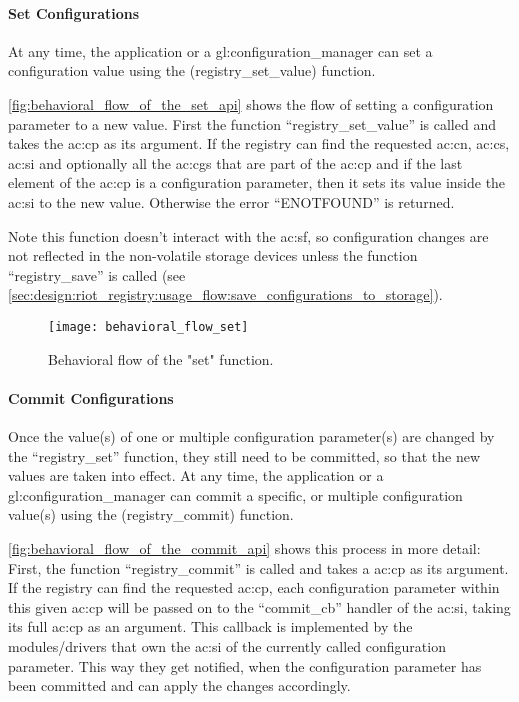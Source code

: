 \paragraph{Set Configurations}\mbox{}

At any time, the application or a \gls{gl:configuration_manager} can set a configuration value using the (registry\_set\_value) function.

\autoref{fig:behavioral_flow_of_the_set_api} shows the flow of setting a configuration parameter to a new value.
First the function ``registry\_set\_value'' is called and takes the \gls{ac:cp} as its argument.
If the registry can find the requested \gls{ac:cn}, \gls{ac:cs}, \gls{ac:si} and optionally all the \glspl{ac:cg} that are part of the \gls{ac:cp} and if the last element of the \gls{ac:cp} is a configuration parameter, then it sets its value inside the \gls{ac:si} to the new value. Otherwise the error ``ENOTFOUND'' is returned.

Note this function doesn't interact with the \gls{ac:sf}, so configuration changes are not reflected in the non-volatile storage devices unless the function ``registry\_save'' is called (see \autoref{sec:design:riot_registry:usage_flow:save_configurations_to_storage}).

\begin{figure}[H]
    \centering
    \texttt{[image: behavioral\_flow\_set]}
    \caption{Behavioral flow of the "set" function.}
    \label{fig:behavioral_flow_of_the_set_api}
\end{figure}

\paragraph{Commit Configurations}\mbox{}
\label{sec:design:commit_configurations}

Once the value(s) of one or multiple configuration parameter(s) are changed by the ``registry\_set'' function, they still need to be committed, so that the new values are taken into effect.
At any time, the application or a \gls{gl:configuration_manager} can commit a specific, or multiple configuration value(s) using the (registry\_commit) function.

\autoref{fig:behavioral_flow_of_the_commit_api} shows this process in more detail:
First, the function ``registry\_commit'' is called and takes a \gls{ac:cp} as its argument.
If the registry can find the requested \gls{ac:cp}, each configuration parameter within this given \gls{ac:cp} will be passed on to the ``commit\_cb'' handler of the \gls{ac:si}, taking its full \gls{ac:cp} as an argument.
This callback is implemented by the modules/drivers that own the \gls{ac:si} of the currently called configuration parameter.
This way they get notified, when the configuration parameter has been committed and can apply the changes accordingly.


